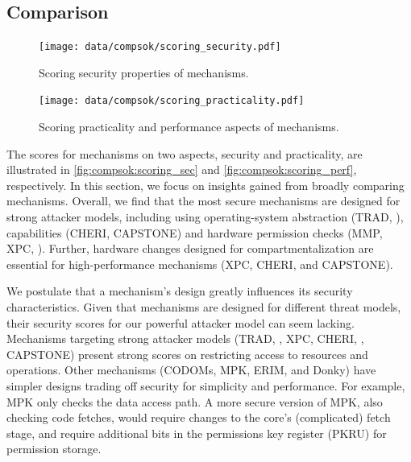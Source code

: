 \subsection{Comparison}
\label{sec:compsok:comparison}
\begin{figure}[ht]
  \centering
  \texttt{[image: data/compsok/scoring\_security.pdf]}
  \caption[Scoring security properties of mechanisms.]
          {Scoring security properties of mechanisms.}
  \label{fig:compsok:scoring_sec}
\end{figure}

\begin{figure}[t]
  \centering
  \texttt{[image: data/compsok/scoring\_practicality.pdf]}
  \caption[Scoring practicality and performance aspects of mechanisms.]
          {Scoring practicality and performance aspects of mechanisms.}
  \label{fig:compsok:scoring_perf}
\end{figure}

The scores for mechanisms on two aspects, security and practicality, 
are illustrated in 
\autoref{fig:compsok:scoring_sec} and \autoref{fig:compsok:scoring_perf},
respectively.
In this section, we focus on insights gained from broadly
comparing mechanisms.
Overall, we find that the most secure mechanisms are designed for strong
attacker models, including using
operating-system abstraction (TRAD, \lwc), capabilities (CHERI, CAPSTONE)
and hardware permission checks (MMP, XPC, \seccells).
Further, hardware changes designed for compartmentalization are essential for
high-performance mechanisms (XPC, CHERI, \seccells and CAPSTONE).

We postulate that a mechanism's design greatly influences its security
characteristics.
Given that mechanisms are designed for different threat models, their
security scores for our powerful attacker model can seem lacking.
Mechanisms targeting strong attacker 
models (TRAD, \lwc, XPC, CHERI, \seccells, CAPSTONE) 
present strong scores on restricting access to resources and operations.
Other mechanisms (CODOMs, MPK, ERIM, and Donky) have simpler designs
trading off security for simplicity and performance.
For example, MPK only checks the data access path. 
A more secure version of MPK, also checking code fetches, would require
changes to the core's (complicated) fetch stage, and require additional
bits in the permissions key register (PKRU) for permission storage.

